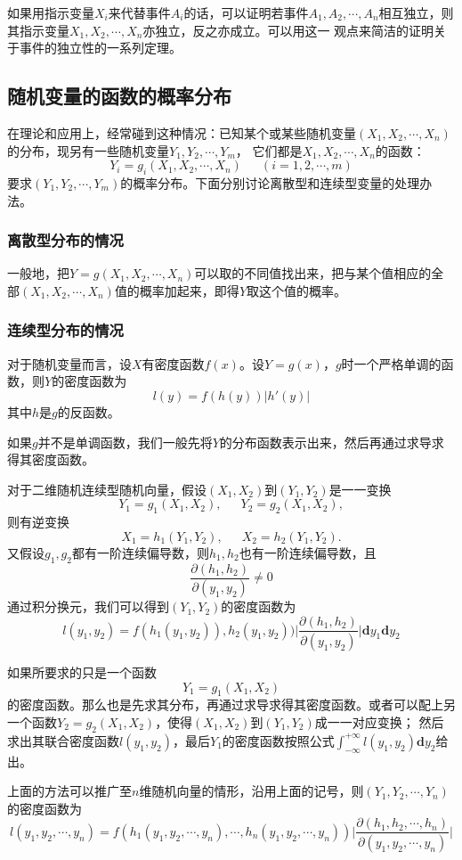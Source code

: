 \documentclass[a4paper,11pt]{article}%
\theoremstyle{remark}
\theoremstyle{remark}
\theoremstyle{definition}
\theoremstyle{definition}
\theoremstyle{plain}
\newcommand*{\abs}[1]{\lvert #1 \rvert}
\begin{document}
如果用指示变量$X_i$来代替事件$A_i$的话，可以证明若事件$A_1,A_2,\cdots,A_n$相互独立，则其指示变量$X_1,X_2,\cdots,X_n$亦独立，反之亦成立。可以用这一
观点来简洁的证明关于事件的独立性的一系列定理。
\subsection{随机变量的函数的概率分布}
在理论和应用上，经常碰到这种情况：已知某个或某些随机变量$(X_1,X_2,\cdots,X_n)$的分布，现另有一些随机变量$Y_1,Y_2,\cdots,Y_m$，
它们都是$X_1,X_2,\cdots,X_n$的函数：
\[Y_i=g_i(X_1,X_2,\cdots,X_n)\phantom{111}(i=1,2,\cdots,m)\]
要求$(Y_1,Y_2,\cdots,Y_m)$的概率分布。下面分别讨论离散型和连续型变量的处理办法。
\subsubsection{离散型分布的情况}
一般地，把$Y=g(X_1,X_2,\cdots,X_n)$可以取的不同值找出来，把与某个值相应的全部$(X_1,X_2,\cdots,X_n)$值的概率加起来，即得$Y$取这个值的概率。
\subsubsection{连续型分布的情况}
对于随机变量而言，设$X$有密度函数$f(x)$。设$Y=g(x)$，$g$时一个严格单调的函数，则$Y$的密度函数为 
\[l(y)=f(h(y))\abs{h'(y)}\]
其中$h$是$g$的反函数。

如果$g$并不是单调函数，我们一般先将$Y$的分布函数表示出来，然后再通过求导求得其密度函数。

对于二维随机连续型随机向量，假设$(X_1,X_2)$到$(Y_1,Y_2)$是一一变换
\[Y_1=g_1(X_1,X_2),\phantom{111}Y_2=g_2(X_1,X_2),\]
则有逆变换
\[X_1=h_1(Y_1,Y_2),\phantom{111}X_2=h_2(Y_1,Y_2).\]
又假设$g_1,g_2$都有一阶连续偏导数，则$h_1,h_2$也有一阶连续偏导数，且
\[\frac{\partial(h_1,h_2)}{\partial(y_1,y_2)}\neq 0\]
通过积分换元，我们可以得到$(Y_1,Y_2)$的密度函数为 
\[l(y_1,y_2)=f(h_1(y_1,y_2)),h_2(y_1,y_2))\abs{\frac{\partial(h_1,h_2)}{\partial(y_1,y_2)}}\mathbf{d}y_1\mathbf{d}y_2\]

如果所要求的只是一个函数
\[Y_1=g_1(X_1,X_2)\]
的密度函数。那么也是先求其分布，再通过求导求得其密度函数。或者可以配上另一个函数$Y_2=g_2(X_1,X_2)$，使得$(X_1,X_2)$到$(Y_1,Y_2)$成一一对应变换；
然后求出其联合密度函数$l(y_1,y_2)$，最后$Y_1$的密度函数按照公式$\int_{-\infty}^{+\infty}l(y_1,y_2)\mathbf{d}y_2$给出。

上面的方法可以推广至$n$维随机向量的情形，沿用上面的记号，则$(Y_1,Y_2,\cdots,Y_n)$的密度函数为 
\[l(y_1,y_2,\cdots,y_n)=f(h_1(y_1,y_2,\cdots,y_n),\cdots,h_n(y_1,y_2,\cdots,y_n))\abs{\frac{\partial(h_1,h_2,\cdots,h_n)}{\partial(y_1,y_2,\cdots,y_n)}}\]
\end{document}
